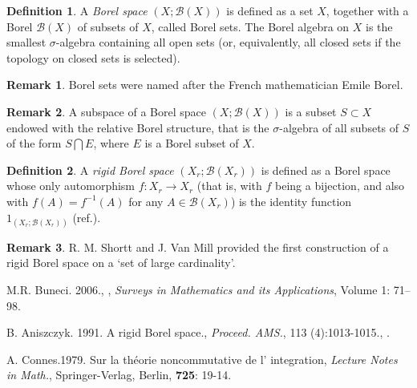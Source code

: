 \documentclass[12pt]{article}
\theoremstyle{plain}
\theoremstyle{definition}
\newtheorem{definition}{Definition}[section]
\newtheorem{remark}{Remark}[section]
\numberwithin{equation}{section}
\begin{document}
\begin{definition}
A {\em Borel space} $(X; \mathcal{B}(X))$ is defined as a set $X$, together with 
a Borel  $\mathcal{B}(X)$ of subsets of $X$, called Borel sets. The Borel algebra on $X$ is the smallest $\sigma$-algebra containing all open sets (or, equivalently, all closed sets if the  topology on closed sets is selected).

\end{definition}

\begin{remark}
Borel sets were named after the French mathematician Emile Borel.
\end{remark}

\begin{remark}
 A subspace of a Borel space $(X; \mathcal{B} (X))$ is a subset $S \subset X$ endowed with the relative Borel structure, that is the $\sigma$-algebra of all subsets of $S$ of the form $S \bigcap E$, where $E$ is a Borel subset of $X$. 
\end{remark}

\begin{definition}
 A \emph{rigid Borel space} $(X_r; \mathcal{B} (X_r))$ is defined as a Borel space whose only automorphism 
$f: X_r \to X_r$ (that is, with $f$ being a bijection, and also with $f(A) = f^{-1}(A)$ for any $A \in \mathcal{B}(X_r)$) is the identity function $1_{(X_r; \mathcal{B}(X_r))}$ (ref.\cite{BA91}).
\end{definition}


\begin{remark}
 R. M. Shortt and J. Van Mill provided the first construction of a rigid Borel space on a `set of large cardinality'.
\end{remark}



\begin{thebibliography}{9}

M.R. Buneci. 2006., 
, 
{\em Surveys in Mathematics and its Applications}, Volume 1: 71--98.

B. Aniszczyk. 1991. A rigid Borel space., {\em Proceed. AMS.}, 113 (4):1013-1015.,
.

A. Connes.1979. Sur la th\'eorie noncommutative de l' integration, {\em Lecture Notes in
Math.},  Springer-Verlag, Berlin, {\bf 725}: 19-14.

\end{thebibliography}
\end{document}
